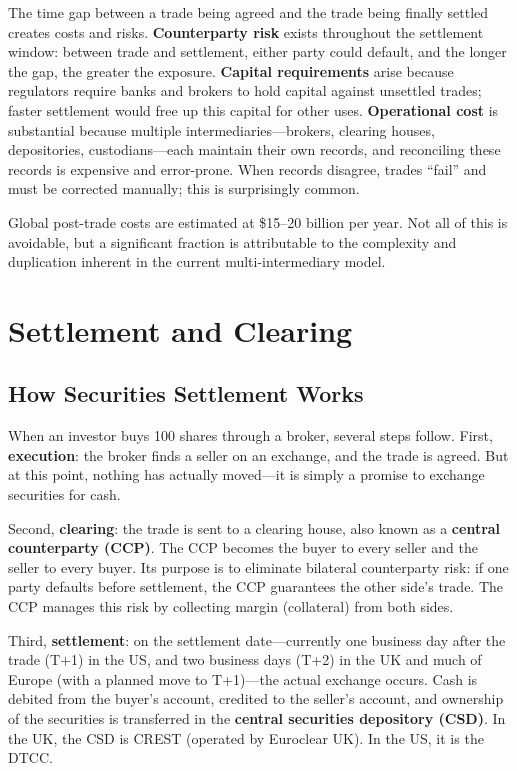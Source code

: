 \documentclass[11pt,a4paper]{article}
\newcommand{\keyword}[1]{\textbf{\textcolor{AccentOrange}{#1}}}
\begin{document}
The time gap between a trade being agreed and the trade being finally settled creates costs and risks. \keyword{Counterparty risk} exists throughout the settlement window: between trade and settlement, either party could default, and the longer the gap, the greater the exposure. \keyword{Capital requirements} arise because regulators require banks and brokers to hold capital against unsettled trades; faster settlement would free up this capital for other uses. \keyword{Operational cost} is substantial because multiple intermediaries---brokers, clearing houses, depositories, custodians---each maintain their own records, and reconciling these records is expensive and error-prone. When records disagree, trades ``fail'' and must be corrected manually; this is surprisingly common.

Global post-trade costs are estimated at \$15--20 billion per year. Not all of this is avoidable, but a significant fraction is attributable to the complexity and duplication inherent in the current multi-intermediary model.

\section{Settlement and Clearing}

\subsection{How Securities Settlement Works}

When an investor buys 100 shares through a broker, several steps follow. First, \keyword{execution}: the broker finds a seller on an exchange, and the trade is agreed. But at this point, nothing has actually moved---it is simply a promise to exchange securities for cash.

Second, \keyword{clearing}: the trade is sent to a clearing house, also known as a \keyword{central counterparty (CCP)}. The CCP becomes the buyer to every seller and the seller to every buyer. Its purpose is to eliminate bilateral counterparty risk: if one party defaults before settlement, the CCP guarantees the other side's trade. The CCP manages this risk by collecting margin (collateral) from both sides.

Third, \keyword{settlement}: on the settlement date---currently one business day after the trade (T+1) in the US, and two business days (T+2) in the UK and much of Europe (with a planned move to T+1)---the actual exchange occurs. Cash is debited from the buyer's account, credited to the seller's account, and ownership of the securities is transferred in the \keyword{central securities depository (CSD)}. In the UK, the CSD is CREST (operated by Euroclear UK). In the US, it is the DTCC.
\end{document}
